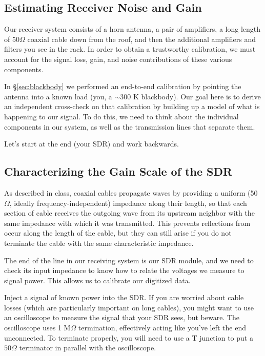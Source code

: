 \documentclass[11pt,preprint]{aastex}
\begin{document}
\subsection{Estimating Receiver Noise and Gain}

Our receiver system consists of a horn antenna, a pair of amplifiers,
a long length of 50$\Omega$
coaxial cable down from the roof, and then the additional amplifiers and 
filters you see in the rack. In order to obtain a trustworthy calibration,
we must account for the signal loss, gain, and noise
contributions of these various components.

In \S\ref{sec:blackbody} we performed an end-to-end calibration by pointing the antenna into
a known load (you, a $\sim$300 K blackbody). Our goal here is to derive an 
independent cross-check on that calibration by building up 
a model of what is happening to our signal.
To do this, we need to think about the individual components in our system,
as well as the transmission lines that separate them.

Let's start at the end (your SDR) and work backwards.

\subsection{Characterizing the Gain Scale of the SDR}
\label{sec:termination}

As described in class, coaxial cables propagate waves by
providing a uniform (50$\Omega$, ideally frequency-independent) impedance 
along their length, so that each
section of cable receives the outgoing wave from its upstream neighbor
with the same impedance with which it was transmitted. This prevents reflections
from occur along the length of the cable, but they can still arise 
if you do not terminate the cable with the same characteristic impedance.

The end of the line in our receiving system is our SDR module, and we need to
check its input impedance to know how to relate the voltages we measure
to signal power. 
This allows us to calibrate our digitized data.

Inject a signal of known power into the SDR. If you are worried about
cable losses (which are particularly important on long cables), you
might want to use an oscilloscope to measure the signal that your SDR
sees, but beware. The oscilloscope uses 1 M$\Omega$ termination, effectively
acting like you've left the end unconnected. To terminate properly, you will
need to use a T junction to put a $50\Omega$ terminator in parallel with
the oscilloscope.
\end{document}
